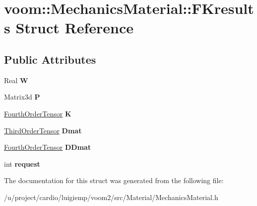 \hypertarget{structvoom_1_1_mechanics_material_1_1_f_kresults}{
\section{voom::MechanicsMaterial::FKresults Struct Reference}
\label{structvoom_1_1_mechanics_material_1_1_f_kresults}
}
\subsection*{Public Attributes}
\begin{DoxyCompactItemize}
\item 
\hypertarget{structvoom_1_1_mechanics_material_1_1_f_kresults_ae92fe3d359d9802327d63e5af0842277}{
Real {\bfseries W}}
\label{structvoom_1_1_mechanics_material_1_1_f_kresults_ae92fe3d359d9802327d63e5af0842277}

\item 
\hypertarget{structvoom_1_1_mechanics_material_1_1_f_kresults_acba4fc986eabebcfdc174e9e366b66e9}{
Matrix3d {\bfseries P}}
\label{structvoom_1_1_mechanics_material_1_1_f_kresults_acba4fc986eabebcfdc174e9e366b66e9}

\item 
\hypertarget{structvoom_1_1_mechanics_material_1_1_f_kresults_a26b9d1c5d2cab669ee8fd113257aba8b}{
\hyperlink{classvoom_1_1_fourth_order_tensor}{FourthOrderTensor} {\bfseries K}}
\label{structvoom_1_1_mechanics_material_1_1_f_kresults_a26b9d1c5d2cab669ee8fd113257aba8b}

\item 
\hypertarget{structvoom_1_1_mechanics_material_1_1_f_kresults_adda72c38bacf7c94216896007bfbe692}{
\hyperlink{classvoom_1_1_third_order_tensor}{ThirdOrderTensor} {\bfseries Dmat}}
\label{structvoom_1_1_mechanics_material_1_1_f_kresults_adda72c38bacf7c94216896007bfbe692}

\item 
\hypertarget{structvoom_1_1_mechanics_material_1_1_f_kresults_a13f698f0e65a0ab3377a0c60d17e0b9e}{
\hyperlink{classvoom_1_1_fourth_order_tensor}{FourthOrderTensor} {\bfseries DDmat}}
\label{structvoom_1_1_mechanics_material_1_1_f_kresults_a13f698f0e65a0ab3377a0c60d17e0b9e}

\item 
\hypertarget{structvoom_1_1_mechanics_material_1_1_f_kresults_a45815013b5540fbd8b3d69beccb0e6f2}{
int {\bfseries request}}
\label{structvoom_1_1_mechanics_material_1_1_f_kresults_a45815013b5540fbd8b3d69beccb0e6f2}

\end{DoxyCompactItemize}


The documentation for this struct was generated from the following file:\begin{DoxyCompactItemize}
\item 
/u/project/cardio/luigiemp/voom2/src/Material/MechanicsMaterial.h\end{DoxyCompactItemize}
